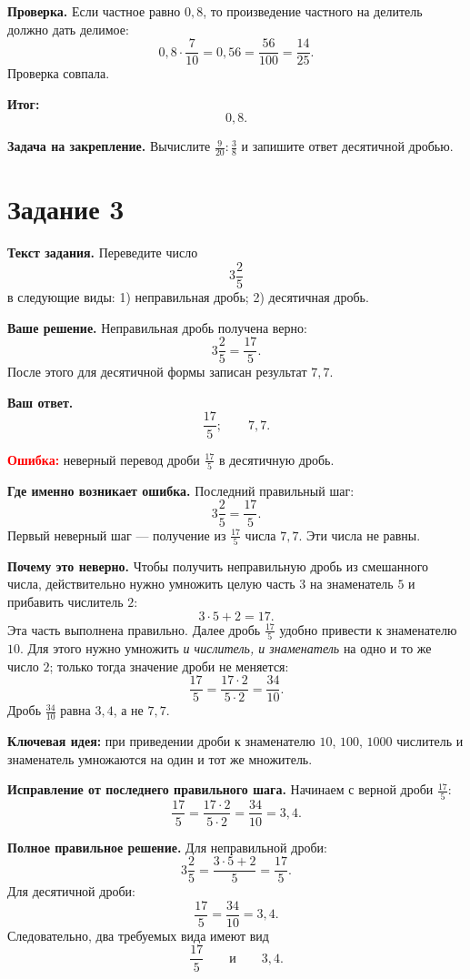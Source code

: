 \documentclass[12pt,a4paper]{article}
\begin{document}
\textbf{Проверка.}
Если частное равно $0{,}8$, то произведение частного на делитель должно дать делимое:
\[
0{,}8\cdot\frac{7}{10}=0{,}56=\frac{56}{100}=\frac{14}{25}.
\]
Проверка совпала.

\textcolor{teal!60!black}{\textbf{Итог:}}
\[
\boxed{0{,}8}.
\]

\textbf{Задача на закрепление.}
Вычислите $\frac{9}{20}:\frac{3}{8}$ и запишите ответ десятичной дробью.

\newpage
{}\label{task:3}
\section*{Задание 3}

\textbf{Текст задания.}
Переведите число
\[
3\frac25
\]
в следующие виды: 1) неправильная дробь; 2) десятичная дробь.

\textbf{Ваше решение.}
Неправильная дробь получена верно:
\[
3\frac25=\frac{17}{5}.
\]
После этого для десятичной формы записан результат $7{,}7$.

\textbf{Ваш ответ.}
\[
\frac{17}{5};\qquad 7{,}7.
\]

\textcolor{red}{\textbf{Ошибка:}} неверный перевод дроби $\frac{17}{5}$ в десятичную дробь.

\textbf{Где именно возникает ошибка.}
Последний правильный шаг:
\[
3\frac25=\frac{17}{5}.
\]
Первый неверный шаг --- получение из $\frac{17}{5}$ числа $7{,}7$. Эти числа не равны.

\textbf{Почему это неверно.}
Чтобы получить неправильную дробь из смешанного числа, действительно нужно умножить целую часть $3$ на знаменатель $5$ и прибавить числитель $2$:
\[
3\cdot5+2=17.
\]
Эта часть выполнена правильно. Далее дробь $\frac{17}{5}$ удобно привести к знаменателю $10$. Для этого нужно умножить \emph{и числитель, и знаменатель} на одно и то же число $2$; только тогда значение дроби не меняется:
\[
\frac{17}{5}=\frac{17\cdot2}{5\cdot2}=\frac{34}{10}.
\]
Дробь $\frac{34}{10}$ равна $3{,}4$, а не $7{,}7$.

\textcolor{blue!60!black}{\textbf{Ключевая идея:}} при приведении дроби к знаменателю $10$, $100$, $1000$ числитель и знаменатель умножаются на один и тот же множитель.

\textbf{Исправление от последнего правильного шага.}
Начинаем с верной дроби $\frac{17}{5}$:
\[
\frac{17}{5}=\frac{17\cdot2}{5\cdot2}=\frac{34}{10}=3{,}4.
\]

\textbf{Полное правильное решение.}
Для неправильной дроби:
\[
3\frac25=\frac{3\cdot5+2}{5}=\frac{17}{5}.
\]
Для десятичной дроби:
\[
\frac{17}{5}=\frac{34}{10}=3{,}4.
\]
Следовательно, два требуемых вида имеют вид
\[
\frac{17}{5}\qquad\text{и}\qquad 3{,}4.
\]
\end{document}
